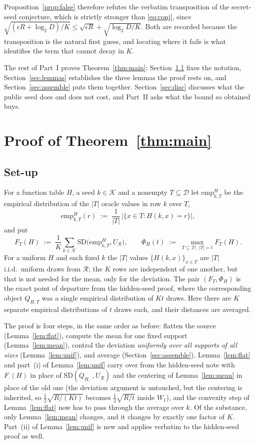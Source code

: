 \documentclass{aicr-solution}
\newcommand{\SD}{\mathrm{SD}}
\newcommand{\calK}{\mathcal{K}}
\newcommand{\calD}{\mathcal{D}}
\newcommand{\calR}{\mathcal{R}}
\newcommand{\emp}{\mathrm{emp}}
\begin{document}
Proposition~\ref{prop:false} therefore refutes the verbatim transposition of the secret-seed
conjecture, which is strictly stronger than \eqref{eq:conj}, since
$\sqrt{(\epsilon R + \log_2 D)/K} \le \sqrt{\epsilon R} + \sqrt{\log_2 D/K}$. Both are recorded
because the transposition is the natural first guess, and locating where it fails is what
identifies the term that cannot decay in $K$.

The rest of Part~I proves Theorem~\ref{thm:main}: Section~\ref{sec:setup} fixes the notation,
Section~\ref{sec:lemmas} establishes the three lemmas the proof rests on, and
Section~\ref{sec:assemble} puts them together. Section~\ref{sec:disc} discusses what the public
seed does and does not cost, and Part~II asks what the bound so obtained buys.

\section{Proof of Theorem~\ref{thm:main}}\label{sec:proof}

\subsection{Set-up}\label{sec:setup}

For a function table $H$, a seed $k \in \calK$ and a nonempty $T \subseteq \calD$ let
$\emp^{H}_{k,T}$ be the empirical distribution of the $|T|$ oracle values in row $k$ over $T$,
\[
  \emp^{H}_{k,T}(r) \;:=\; \frac{1}{|T|}\,\bigl|\{x \in T : H(k,x) = r\}\bigr| ,
\]
and put
\[
  F_{T}(H) \;:=\; \frac{1}{K}\sum_{k \in \calK} \SD\bigl(\emp^{H}_{k,T}, U_{\calR}\bigr),
  \qquad
  \Phi_{H}(t) \;:=\; \max_{T \subseteq \calD,\; |T| = t} F_{T}(H) .
\]
For a uniform $H$ and each fixed $k$ the $|T|$ values $\{H(k,x)\}_{x \in T}$ are $|T|$ i.i.d.\
uniform draws from $\calR$; the $K$ rows are independent of one another, but that is not needed for
the mean, only for the deviation. The pair $(F_{T}, \Phi_{H})$ is the exact point of departure from the hidden-seed proof,
where the corresponding object $Q_{H,T}$ was a single empirical distribution of $Kt$ draws. Here
there are $K$ separate empirical distributions of $t$ draws each, and their distances are averaged.

\smallskip
The proof is four steps, in the same order as before: flatten the source (Lemma~\ref{lem:flat}),
compute the mean for one fixed support (Lemma~\ref{lem:mean}), control the deviation \emph{uniformly
over all supports of all sizes} (Lemma~\ref{lem:unif}), and average (Section~\ref{sec:assemble}).
Lemma~\ref{lem:flat} and part~(i) of Lemma~\ref{lem:unif} carry over from the hidden-seed note with
$F_{\cdot}(H)$ in place of $\SD(Q_{H,\cdot},U_{\calR})$ and the centering of
Lemma~\ref{lem:mean} in place of the old one (the deviation argument is untouched, but the
centering is inherited, so $\tfrac12\sqrt{R/(Kt)}$ becomes $\tfrac12\sqrt{R/t}$ inside $W_{1}$),
and the convexity step of Lemma~\ref{lem:flat} now has to pass through the average over $k$. Of the
substance, only Lemma~\ref{lem:mean} changes, and it changes by exactly one factor of $K$.
Part~(ii) of Lemma~\ref{lem:unif} is new and applies verbatim to the hidden-seed proof as well.
\end{document}

